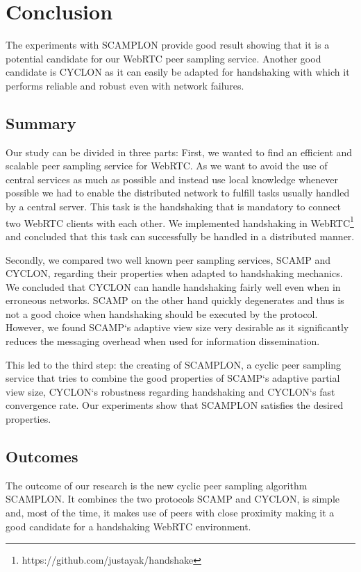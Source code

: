 \documentclass[11pt, english, screen]{report-rd-info}
\begin{document}
\chapter{Conclusion}

The experiments with SCAMPLON provide good result showing that it is a potential candidate for our WebRTC peer sampling service.
Another good candidate is CYCLON as it can easily be adapted for handshaking with which it performs reliable and robust even with network failures.

\section{Summary}

Our study can be divided in three parts:
First, we wanted to find an efficient and scalable peer sampling service for WebRTC.
As we want to avoid the use of central services as much as possible and instead use local knowledge whenever possible we had to enable the distributed network to fulfill tasks usually handled by a central server.
This task is the handshaking that is mandatory to connect two WebRTC clients with each other.
We implemented handshaking in WebRTC\footnote{https://github.com/justayak/handshake} and concluded that this task can successfully be handled in a distributed manner.

Secondly, we compared two well known peer sampling services, SCAMP and CYCLON, regarding their properties when adapted to handshaking mechanics.
We concluded that CYCLON can handle handshaking fairly well even when in erroneous networks.
SCAMP on the other hand quickly degenerates and thus is not a good choice when handshaking should be executed by the protocol.
However, we found SCAMP`s adaptive view size very desirable as it significantly reduces the messaging overhead when used for information dissemination.

This led to the third step: the creating of SCAMPLON, a cyclic peer sampling service that tries to combine the good properties of SCAMP`s adaptive partial view size, CYCLON`s robustness regarding handshaking and CYCLON`s fast convergence rate.
Our experiments show that SCAMPLON satisfies the desired properties.

\section{Outcomes}

The outcome of our research is the new cyclic peer sampling algorithm SCAMPLON.
It combines the two protocols SCAMP and CYCLON, is simple and, most of the time, it makes use of peers with close proximity making it a good candidate for a handshaking WebRTC environment.
\end{document}
